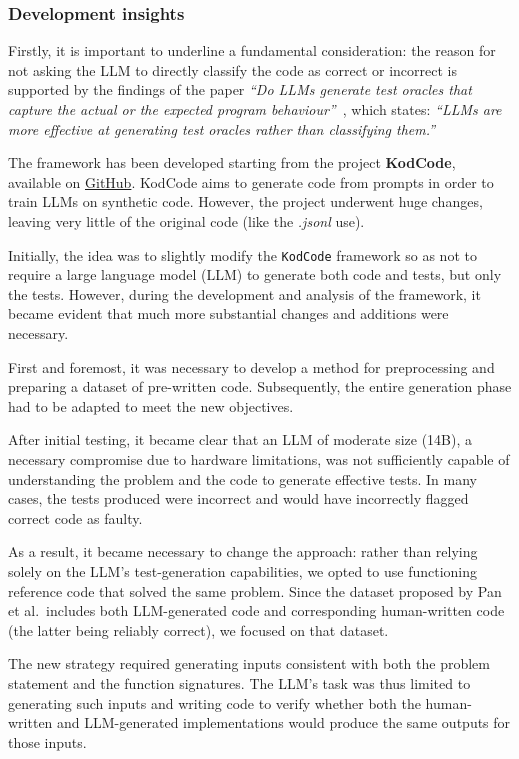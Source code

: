 \subsubsection{Development insights}
Firstly, it is important to underline a fundamental consideration:
the reason for not asking the LLM to directly classify the code as 
correct or incorrect is supported by the findings of the paper 
\textit{``Do LLMs generate test oracles that capture the actual or 
the expected program behaviour''}~\cite{konstantinou2024llms}, which states: 
\textit{``LLMs are more effective at generating test oracles rather than classifying them.''}

The framework has been developed starting from the project \textbf{KodCode}\cite{xu2025kodcode}, 
available on \href{https://github.com/KodCode-AI/kodcode/tree/main}{GitHub}. 
KodCode aims to generate code from prompts in order to train LLMs on 
synthetic code. 
However, the project underwent huge changes, leaving very 
little of the original code (like the \textit{.jsonl} use).


Initially, the idea was to slightly modify the \texttt{KodCode} 
framework so as not to require a large language model (LLM) 
to generate both code and tests, but only the tests. 
However, during the development and analysis of the 
framework, it became evident that much more substantial 
changes and additions were necessary.

First and foremost, it was necessary to develop a 
method for preprocessing and preparing a dataset of 
pre-written code. Subsequently, the entire generation 
phase had to be adapted to meet the new objectives.

After initial testing, it became clear that an LLM 
of moderate size (14B), a necessary compromise due to 
hardware limitations, was not sufficiently capable of 
understanding the problem and the code to generate 
effective tests. In many cases, the tests produced 
were incorrect and would have incorrectly flagged 
correct code as faulty.

As a result, it became necessary to change the 
approach: rather than relying solely on the LLM’s 
test-generation capabilities, we opted to use 
functioning reference code that solved the same problem. 
Since the dataset proposed by Pan et al.\ includes both 
LLM-generated code and corresponding human-written code 
(the latter being reliably correct), we focused on that 
dataset.

The new strategy required generating inputs consistent 
with both the problem statement and the function signatures. 
The LLM's task was thus limited to generating such inputs 
and writing code to verify whether both the human-written 
and LLM-generated implementations would produce the same 
outputs for those inputs.

